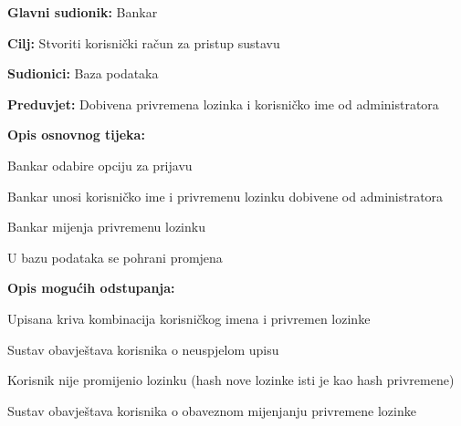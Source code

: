			
			   \noindent {}
			\begin{packed_item}
				
				\item \textbf{Glavni sudionik: }Bankar
				\item  \textbf{Cilj:} Stvoriti korisnički račun za pristup sustavu
				\item  \textbf{Sudionici:} Baza podataka
				\item  \textbf{Preduvjet:} Dobivena privremena lozinka i korisničko ime od administratora
				\item  \textbf{Opis osnovnog tijeka:}
				
				\item[] \begin{packed_enum}
					
					\item  Bankar odabire opciju za prijavu
					\item  Bankar unosi korisničko ime i privremenu lozinku dobivene od administratora
					\item  Bankar mijenja privremenu lozinku 
					\item  U bazu podataka se pohrani promjena 
				\end{packed_enum}
				
				\item  \textbf{Opis mogućih odstupanja:}
				
				\item[] \begin{packed_enum}
					
					\item[2.a] Upisana kriva kombinacija korisničkog imena i privremen lozinke
					\item[] \begin{packed_enum}
						
						\item Sustav obavještava korisnika o neuspjelom upisu 
						
						
					\end{packed_enum}
					\item[] \begin{packed_enum}
					
					\item[4a] Korisnik nije promijenio lozinku (hash nove lozinke isti je kao hash privremene)
					\item[] \begin{packed_enum}
						
						\item Sustav obavještava korisnika o obaveznom mijenjanju privremene lozinke
						
						
						\end{packed_enum}
					\end{packed_enum}
				\end{packed_enum}
			\end{packed_item}
		
